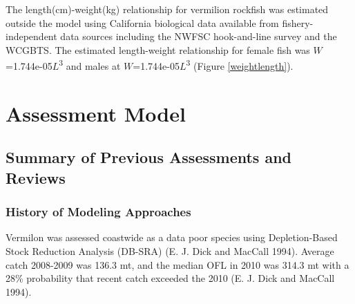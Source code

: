 \documentclass[11pt,
  english,
  a4paper,
]{article}
\begin{document}
\leavevmode\tagmcend\tagstructend

The length(cm)-weight(kg) relationship for vermilion rockfish was estimated outside the model using California biological data available from fishery-independent data sources including the NWFSC hook-and-line survey and the WCGBTS. The estimated length-weight relationship for female fish was {\(W\)\leavevmode\tagmcend\tagstructend}=1.744e-05{\(L\)\leavevmode\tagmcend\tagstructend}\textsuperscript{3} and males at {\(W\)\leavevmode\tagmcend\tagstructend}=1.744e-05{\(L\)\leavevmode\tagmcend\tagstructend}\textsuperscript{3} (Figure \ref{weightlength}).


\hypertarget{assessment-model}{%
\section{Assessment Model}\label{assessment-model}}

\leavevmode\tagmcend\tagstructend


\hypertarget{summary-of-previous-assessments-and-reviews}{%
\subsection{Summary of Previous Assessments and Reviews}\label{summary-of-previous-assessments-and-reviews}}

\leavevmode\tagmcend\tagstructend


\hypertarget{history-of-modeling-approaches}{%
\subsubsection{History of Modeling Approaches}\label{history-of-modeling-approaches}}

\leavevmode\tagmcend\tagstructend

Vermilon was assessed coastwide as a data poor species using Depletion-Based Stock Reduction Analysis (DB-SRA) {(E. J. Dick and MacCall 1994)\leavevmode\tagmcend\tagstructend}. Average catch 2008-2009 was 136.3 mt, and the median OFL in 2010 was 314.3 mt with a 28\% probability that recent catch exceeded the 2010 {(E. J. Dick and MacCall 1994)\leavevmode\tagmcend\tagstructend}.
\end{document}
